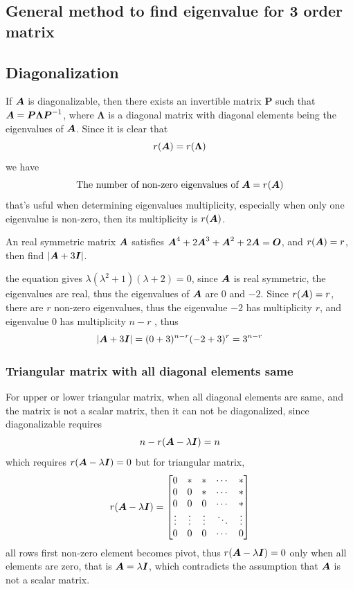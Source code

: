 \documentclass{overview}
\begin{document}
\subsection{General method to find eigenvalue for 3 order matrix}

\subsection{Diagonalization}

If $\boldsymbol{A}$ is diagonalizable, then there exists an invertible matrix $\boldsymbol{P}$
such that $\boldsymbol{A}=\boldsymbol{P}\boldsymbol{\Lambda}\boldsymbol{P}^{-1}$,
where $\boldsymbol{\Lambda}$ is a diagonal matrix with diagonal elements
being the eigenvalues of $\boldsymbol{A}$. Since it is clear that
\[
	r(\boldsymbol{A}) = r(\boldsymbol{\Lambda})
\] 
we have
\[
	\text{The number of non-zero eigenvalues of } \boldsymbol{A} = r(\boldsymbol{A})
\] 
that's usful when determining eigenvalues multiplicity, especially when only
one eigenvalue is non-zero, then its multiplicity is $r(\boldsymbol{A})$.

\begin{example}
An real symmetric matrix $\boldsymbol{A}$ satisfies $\boldsymbol{A}^{4}+2\boldsymbol{A}^{3}+\boldsymbol{A}^{2}+2\boldsymbol{A}=\boldsymbol{O}$,
and $r(\boldsymbol{A})=r$, then find $|\boldsymbol{A}+3\boldsymbol{I}|$.
\begin{answer}
the equation gives $\lambda(\lambda ^2+1)(\lambda +2)=0$, since
$\boldsymbol{A}$ is real symmetric, the eigenvalues are real, thus the eigenvalues of $\boldsymbol{A}$ are
$0$ and $-2$. Since $r(\boldsymbol{A})=r$, there are $r$ non-zero eigenvalues, thus
the eigenvalue $-2$ has multiplicity $r$, and eigenvalue $0$ has multiplicity $n-r$
, thus
\[	|\boldsymbol{A}+3\boldsymbol{I}| = (0+3)^{n-r}(-2+3)^{r} =  3^{n-r} \]
\end{answer}
\end{example}

\subsubsection{ Triangular matrix with all diagonal elements same}
For upper or lower triangular matrix, when all diagonal elements are same, 
and the matrix is not a scalar matrix, then it can not be diagonalized, since 
diagonalizable requires
\[
	n-r(\boldsymbol{A} - \lambda\boldsymbol{I}) = n
\] 
which requires $r(\boldsymbol{A} - \lambda\boldsymbol{I}) = 0$ but for triangular matrix,
\[
r(\boldsymbol{A} - \lambda\boldsymbol{I})=\begin{bmatrix}
	0 & * & * & \cdots & * \\
	0 & 0 & * & \cdots & * \\
	0 & 0 & 0 & \cdots & * \\
	\vdots & \vdots & \vdots & \ddots & \vdots \\
	0 & 0 & 0 & \cdots & 0 \\
\end{bmatrix}
\] 
all rows first non-zero element becomes pivot, thus $r(\boldsymbol{A} - \lambda\boldsymbol{I}) = 0$ only when
all elements are zero, that is $\boldsymbol{A} = \lambda \boldsymbol{I}$, which contradicts the assumption that
$\boldsymbol{A}$ is not a scalar matrix.
\end{document}

